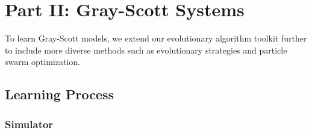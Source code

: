 \chapter{Part II: Gray-Scott Systems} \label{gray-scott}

To learn Gray-Scott models, we extend our evolutionary algorithm toolkit further to include more diverse methods such as evolutionary strategies and particle swarm optimization.

\section{Learning Process}

\subsection{Simulator} \label{subsec:simulator}


